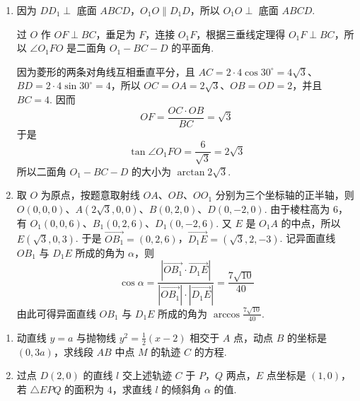 \documentclass[UTF8,a4paper,oneside,11pt]{ctexbook}
\begin{document}
\begin{solution}
\begin{enumerate}
\item 因为 \(DD_{1}\perp\) 底面 \(ABCD\)，\(O_{1}O\parallel D_{1}D\)，所以 \(O_{1}O\perp\) 底面 \(ABCD\).

过 \(O\) 作 \(OF\perp BC\)，垂足为 \(F\)，连接 \(O_{1}F\)，根据三垂线定理得 \(O_{1}F\perp BC\)，所以 \(\angle O_{1}FO\) 是二面角 \(O_{1}-BC-D\) 的平面角.

因为菱形的两条对角线互相垂直平分，且 \(AC=2\cdot4\cos30^\circ=4\sqrt{3}\)、\(BD=2\cdot4\sin30^\circ=4\)，所以 \(OC=OA=2\sqrt{3}\)、\(OB=OD=2\)，并且 \(BC=4\). 因而
\[
OF=\frac{OC\cdot OB}{BC}=\sqrt{3}
\]
于是
\[
\tan\angle O_{1}FO=\frac{6}{\sqrt{3}}=2\sqrt{3}
\]
所以二面角 \(O_{1}-BC-D\) 的大小为 \(\arctan 2\sqrt{3}\).

\item 取 \(O\) 为原点，按题意取射线 \(OA\)、\(OB\)、\(OO_1\) 分别为三个坐标轴的正半轴，则 \(O(0,0,0)\)、\(A(2\sqrt{3},0,0)\)、\(B(0,2,0)\)、\(D(0,-2,0)\). 由于棱柱高为 \(6\)，有 \(O_1(0,0,6)\)、\(B_1(0,2,6)\)、\(D_1(0,-2,6)\). 又 \(E\) 是 \(O_1A\) 的中点，所以 \(E(\sqrt{3},0,3)\).
于是 \(\overrightarrow{OB_{1}}=(0,2,6)\)，\(\overrightarrow{D_{1}E}=(\sqrt{3},2,-3)\).
记异面直线 \(OB_{1}\) 与 \(D_{1}E\) 所成的角为 \(\alpha\)，则
\[
\cos\alpha=\frac{|\overrightarrow{OB_{1}}\cdot\overrightarrow{D_{1}E}|}{|\overrightarrow{OB_{1}}|\cdot|\overrightarrow{D_{1}E}|}
=\frac{7\sqrt{10}}{40}
\]
由此可得异面直线 \(OB_{1}\) 与 \(D_{1}E\) 所成的角为 \(\arccos\frac{7\sqrt{10}}{40}\).
\end{enumerate}
\end{solution}

\begin{problem}
\begin{enumerate}
\item 动直线 \(y = a\) 与抛物线 \(y^{2} = \frac{1}{2}(x - 2) \) 相交于 \(A\) 点，动点 \(B\) 的坐标是 \((0, 3a) \)，求线段 \(AB\) 中点 \(M\) 的轨迹 \(C\) 的方程.
\item 过点 \(D(2,0)\) 的直线 \(l\) 交上述轨迹 \(C\) 于 \(P\)，\(Q\) 两点，\(E\) 点坐标是 \((1,0)\)，若 \(\triangle EPQ\) 的面积为 \(4\)，求直线 \(l\) 的倾斜角 \(\alpha \) 的值.
\end{enumerate}
\end{problem}
\end{document}
